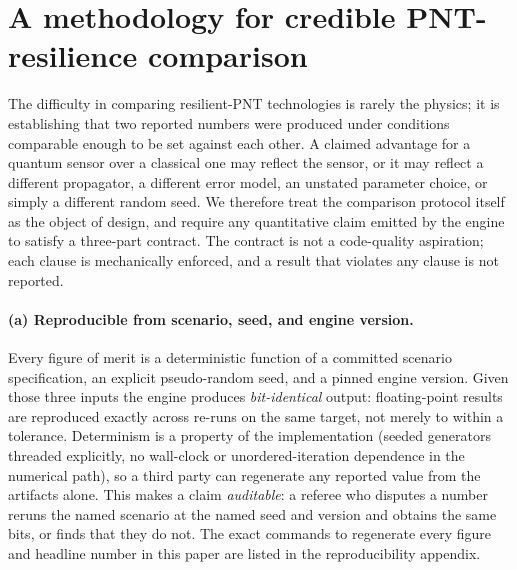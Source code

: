 \section{A methodology for credible PNT-resilience comparison}\label{sec:method}

The difficulty in comparing resilient-PNT technologies is rarely the physics; it
is establishing that two reported numbers were produced under conditions
comparable enough to be set against each other. A claimed advantage for a
quantum sensor over a classical one may reflect the sensor, or it may reflect a
different propagator, a different error model, an unstated parameter choice, or
simply a different random seed. We therefore treat the comparison protocol
itself as the object of design, and require any quantitative claim emitted by
the engine to satisfy a three-part contract. The contract is not a code-quality
aspiration; each clause is mechanically enforced, and a result that violates any
clause is not reported.

\paragraph{(a) Reproducible from scenario, seed, and engine version.}
Every figure of merit is a deterministic function of a committed scenario
specification, an explicit pseudo-random seed, and a pinned engine version.
Given those three inputs the engine produces \emph{bit-identical} output: floating-point
results are reproduced exactly across re-runs on the same target, not merely to
within a tolerance. Determinism is a property of the implementation
(seeded generators threaded explicitly, no wall-clock or
unordered-iteration dependence in the numerical path), so a third party can
regenerate any reported value from the artifacts alone. This makes a claim
\emph{auditable}: a referee who disputes a number reruns the named scenario at
the named seed and version and obtains the same bits, or finds that they do not.
The exact commands to regenerate every figure and headline number in this paper
are listed in the reproducibility appendix.

